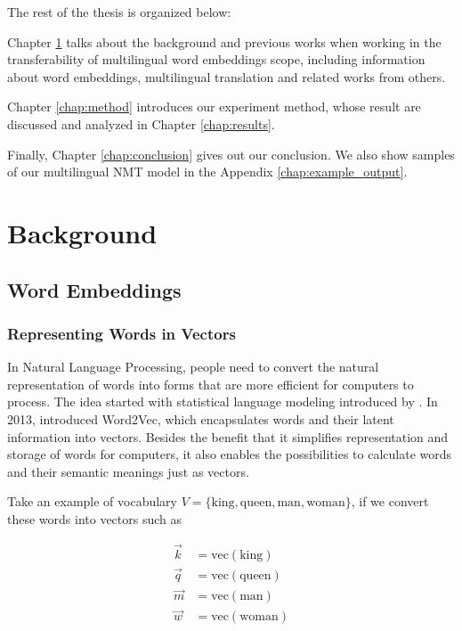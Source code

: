 \documentclass[thesis,fonts=libertine]{cluu}
\begin{document}
The rest of the thesis is organized below:

Chapter \ref{chap:background} talks about the background and previous works when working in the transferability of multilingual word embeddings scope, including information about word embeddings, multilingual translation and related works from others.

Chapter \ref{chap:method} introduces our experiment method, whose result are discussed and analyzed in Chapter \ref{chap:results}.

Finally, Chapter \ref{chap:conclusion} gives out our conclusion. We also show samples of our multilingual NMT model in the Appendix \ref{chap:example_output}.

\chapter{Background}
\label{chap:background}

\section{Word Embeddings}
\subsection{Representing Words in Vectors}

In Natural Language Processing, people need to convert the natural representation of words into forms that are more efficient for computers to process. The idea started with statistical language modeling introduced by \cite{bengio2003neural}. In 2013, \cite{Mikolov:2013aa} introduced Word2Vec, which encapsulates words and their latent information into vectors. Besides the benefit that it simplifies representation and storage of words for computers, it also enables the possibilities to calculate words and their semantic meanings just as vectors.

Take an example of vocabulary $V=\{\text{king}, \text{queen}, \text{man}, \text{woman}\}$, if we convert these words into vectors such as 

\begin{align*}
  \vec{k} &= \text{vec}(\text{king})\\
  \vec{q} &= \text{vec}(\text{queen})\\
  \vec{m} &= \text{vec}(\text{man})\\
  \vec{w} &= \text{vec}(\text{woman})
\end{align*}
\end{document}
